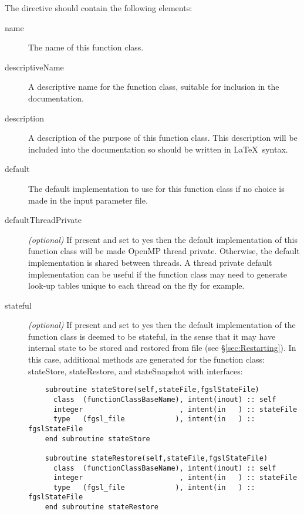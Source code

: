 The directive should contain the following elements:
\begin{description}
\item[{\normalfont \ttfamily name}] The name of this function class.
\item[{\normalfont \ttfamily descriptiveName}] A descriptive name for the function class, suitable for inclusion in the documentation.
\item[{\normalfont \ttfamily description}] A description of the purpose of this function class. This description will be included into the documentation so should be written in \LaTeX\ syntax.
\item[{\normalfont \ttfamily default}] The default implementation to use for this function class if no choice is made in the input parameter file.
\item[{\normalfont \ttfamily defaultThreadPrivate}] \emph{(optional)} If present and set to {\normalfont \ttfamily yes} then the default implementation of this function class will be made OpenMP thread private. Otherwise, the default implementation is shared between threads. A thread private default implementation can be useful if the function class may need to generate look-up tables unique to each thread on the fly for example.
\item[{\normalfont \ttfamily stateful}] \emph{(optional)} If present and set to {\normalfont \ttfamily yes} then the default implementation of the function class is deemed to be stateful, in the sense that it may have internal state to be stored and restored from file (see \S\ref{sec:Restarting}). In this case, additional methods are generated for the function class: {\normalfont \ttfamily stateStore}, {\normalfont \ttfamily stateRestore}, and {\normalfont \ttfamily stateSnapshot} with interfaces:
  \begin{lstlisting}
    subroutine stateStore(self,stateFile,fgslStateFile)
      class  (functionClassBaseName), intent(inout) :: self
      integer                       , intent(in   ) :: stateFile
      type   (fgsl_file            ), intent(in   ) :: fgslStateFile
    end subroutine stateStore

    subroutine stateRestore(self,stateFile,fgslStateFile)
      class  (functionClassBaseName), intent(inout) :: self
      integer                       , intent(in   ) :: stateFile
      type   (fgsl_file            ), intent(in   ) :: fgslStateFile
    end subroutine stateRestore


\end{lstlisting}
\end{description}
